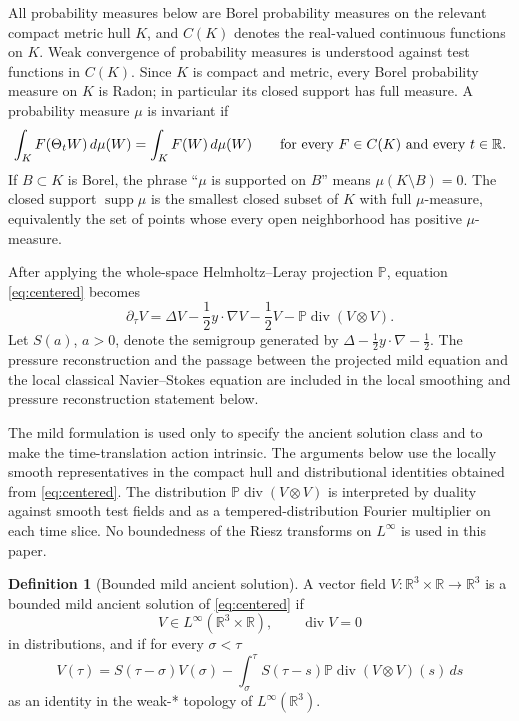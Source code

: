 \documentclass[11pt]{amsart}
\theoremstyle{plain}
\theoremstyle{definition}
\newtheorem{definition}[theorem]{Definition}
\theoremstyle{remark}
\numberwithin{equation}{section}
\begin{document}
All probability measures below are Borel probability measures on the relevant
compact metric hull \(K\), and \(C(K)\) denotes the real-valued continuous
functions on \(K\).  Weak convergence of probability measures is understood
against test functions in \(C(K)\).  Since \(K\) is compact and metric, every
Borel probability measure on \(K\) is Radon; in particular its closed support
has full measure.  A probability measure \(\mu\) is invariant if
\[
   \int_K F(\Theta_tW)\,d\mu(W)
   =
   \int_K F(W)\,d\mu(W)
   \qquad\hbox{for every }F\in C(K)\hbox{ and every }t\in\mathbb R .
\]
If \(B\subset K\) is Borel, the phrase ``\(\mu\) is supported on \(B\)''
means \(\mu(K\setminus B)=0\).  The closed support
\(\operatorname{supp}\mu\) is the smallest closed subset of \(K\) with full
\(\mu\)-measure, equivalently the set of points whose every open
neighborhood has positive \(\mu\)-measure.

After applying the whole-space Helmholtz--Leray projection \(\mathbb P\),
equation \eqref{eq:centered} becomes
\begin{equation}\label{eq:projected}
   \partial_\tau V
   =
   \Delta V-\frac12y\cdot\nabla V-\frac12V
   -\mathbb P\operatorname{div}(V\otimes V).
\end{equation}
Let \(S(a)\), \(a>0\), denote the semigroup generated by
\(\Delta-\frac12y\cdot\nabla-\frac12\).  The pressure reconstruction and the
passage between the projected mild equation and the local classical
Navier--Stokes equation are included in the local smoothing and pressure
reconstruction statement below.

The mild formulation is used only to specify the ancient solution class and
to make the time-translation action intrinsic.  The arguments below use the
locally smooth representatives in the compact hull and distributional
identities obtained from \eqref{eq:centered}.  The distribution
\(\mathbb P\operatorname{div}(V\otimes V)\) is interpreted by duality against
smooth test fields and as a tempered-distribution Fourier multiplier on each
time slice.  No boundedness of the Riesz transforms on \(L^\infty\) is used in
this paper.

\begin{definition}[Bounded mild ancient solution]\label{def:mild}
A vector field \(V:\mathbb R^3\times\mathbb R\to\mathbb R^3\) is a bounded
mild ancient solution of \eqref{eq:centered} if
\[
   V\in L^\infty(\mathbb R^3\times\mathbb R),\qquad \operatorname{div}V=0
\]
in distributions, and if for every \(\sigma<\tau\)
\begin{equation}\label{eq:mild}
   V(\tau)
   =
   S(\tau-\sigma)V(\sigma)
   -
   \int_\sigma^\tau
   S(\tau-s)\mathbb P\operatorname{div}(V\otimes V)(s)\,ds
\end{equation}
as an identity in the weak-* topology of \(L^\infty(\mathbb R^3)\).
\end{definition}
\end{document}
